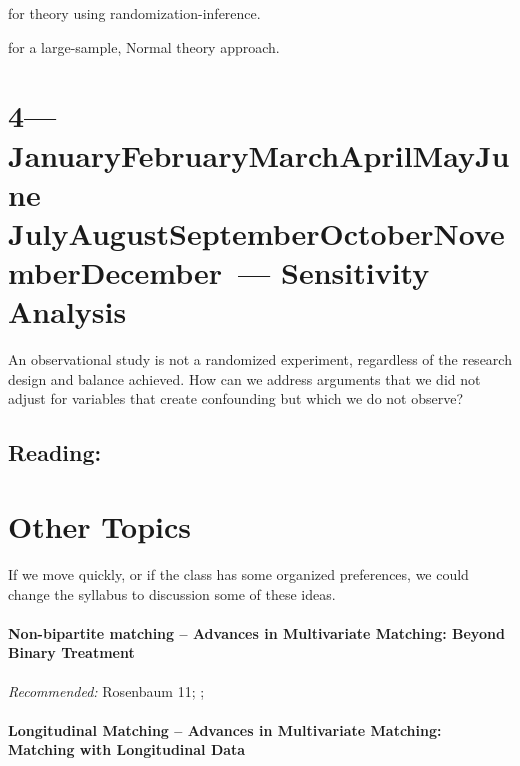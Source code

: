 \documentclass[10pt]{article}
\def\themonth{\ifcase\month\or
  January\or February\or March\or April\or May\or June\or
  July\or August\or September\or October\or November\or December\fi}
\begin{document}
\cite{hansen2009prop} for theory using randomization-inference.

\cite{abadie2009matching} for a large-sample, Normal theory approach.

\cite{hosman2010}

\citet[Chap 14]{rosenbaum2010design}


\citet[Chap 4]{rosenbaum:2002}

\cite{imbens2003sea}


\AdvanceDate[1]
\section{4---\themonth~\the\day--- Sensitivity Analysis }

An observational study is not a randomized experiment, regardless of the
research design and balance achieved. How can we address arguments that we did
not adjust for variables that create confounding but which we do not observe?

\subsection{Reading:}

\cite{cornfield:1959}

\cite{hosman2010}

\citet[Chap 14]{rosenbaum2010design}

\citet[Chap 4]{rosenbaum:2002}

\cite{imbens2003sea}


\section{Other Topics}

If we move quickly, or if the class has some organized preferences, we could
change the syllabus to discussion some of these ideas.


\paragraph{Non-bipartite matching -- Advances in Multivariate Matching: Beyond Binary Treatment }

\emph{Recommended:}  Rosenbaum 11; \cite{lu2011optimal};\cite{imaivandyk:04}

\paragraph{Longitudinal Matching -- Advances in Multivariate Matching: Matching with Longitudinal Data}
\end{document}
